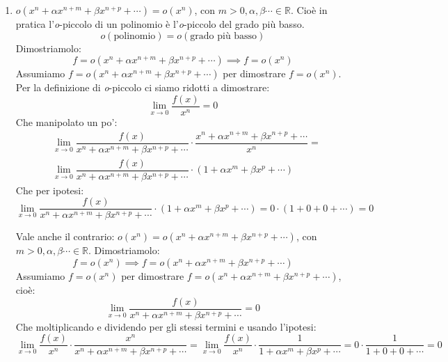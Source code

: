 \begin{enumerate}
	\item $o(x^n + \alpha x^{n+m} + \beta x^{n + p} + \cdots) = o(x^n)$, con 
        $m > 0, \alpha, \beta \cdots \in \mathbb{R}$. Cioè in pratica 
        l'\textit{o}-piccolo di un polinomio è l'\textit{o}-piccolo del grado 
        più basso.
		\begin{equation*}
			o(\text{polinomio}) = o(\text{grado più basso})
		\end{equation*}
		Dimostriamolo:
		\begin{equation*}
			f = o(x^n + \alpha x^{n+m} + \beta x^{n + p} + \cdots) \implies f 
            = o(x^n)
		\end{equation*}
		Assumiamo $f = o(x^n + \alpha x^{n+m} + \beta x^{n + p} + \cdots)$ per 
        dimostrare $f = o(x^n)$. Per la definizione di \textit{o}-piccolo ci 
        siamo ridotti a dimostrare:
		\begin{equation*}
			\lim_{x \to 0} \dfrac{f(x)}{x^n} = 0
		\end{equation*}
		Che manipolato un po':
		\begin{align*}
			&\lim_{x \to 0} \dfrac{f(x)}{x^n + \alpha x^{n+m} + \beta x^{n + 
            p} + \cdots} \cdot \dfrac{x^n + \alpha x^{n+m} + \beta x^{n + p} + 
            \cdots}{x^n} =\\[10pt]
			&\lim_{x \to 0} \dfrac{f(x)}{x^n + \alpha x^{n+m} + \beta x^{n + p} 
            + \cdots} \cdot (1 + \alpha x^{m} + \beta x^{p} + \cdots)
		\end{align*}
		Che per ipotesi:
		\begin{equation*}
			\lim_{x \to 0} \dfrac{f(x)}{x^n + \alpha x^{n+m} + \beta x^{n + p} 
            + \cdots} \cdot (1 + \alpha x^{m} + \beta x^{p} + \cdots) = 0 \cdot 
            (1 + 0 + 0 + \cdots) = 0
		\end{equation*}

		Vale anche il contrario: $o(x^n) = o(x^n + \alpha x^{n+m} + \beta x^{n 
        + p} + \cdots)$, con $m > 0, \alpha, \beta \cdots \in \mathbb{R}$. 
        Dimostriamolo:
		\begin{equation*}
			f = o(x^n) \implies f = o(x^n + \alpha x^{n+m} + \beta x^{n + p} + 
            \cdots)
		\end{equation*}
		Assumiamo $f = o(x^n)$ per dimostrare $f = o(x^n + \alpha x^{n+m} + 
        \beta x^{n + p} + \cdots)$, cioè:
		\begin{equation*}
			\lim_{x \to 0} \dfrac{f(x)}{x^n + \alpha x^{n+m} + \beta x^{n + p} 
            + \cdots} = 0
		\end{equation*}
		Che moltiplicando e dividendo per gli stessi termini e usando 
        l'ipotesi:
		\begin{equation*}
			\lim_{x \to 0} \dfrac{f(x)}{x^n} \cdot \dfrac{x^n}{x^n + \alpha 
            x^{n+m} + \beta x^{n + p} + \cdots} = \lim_{x \to 0} \dfrac{f(x)}
            {x^n} \cdot \dfrac{1}{1 + \alpha x^{m} + \beta x^{p} + \cdots} = 0 
            \cdot \dfrac{1}{1 + 0 + 0 + \cdots} = 0
		\end{equation*}


\end{enumerate}
